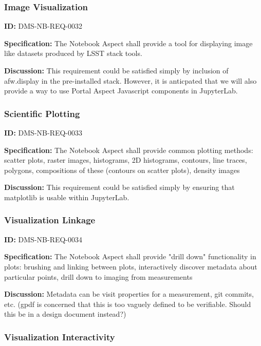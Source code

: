\documentclass[SE,toc]{lsstdoc}
\begin{document}
\subsubsection{Image Visualization}

\label{DMS-NB-REQ-0032}
\textbf{ID:} DMS-NB-REQ-0032

\textbf{Specification:}
The Notebook Aspect shall provide a tool for displaying image like datasets produced by LSST stack tools.

\textbf{Discussion:}
This requirement could be satisfied simply by inclusion of afw.display in the pre-installed stack.  However, it is anticpated that we will also provide a way to use Portal Aspect Javascript components in JupyterLab.

\subsubsection{Scientific Plotting}

\label{DMS-NB-REQ-0033}
\textbf{ID:} DMS-NB-REQ-0033

\textbf{Specification:}
The Notebook Aspect shall provide common plotting methods:
scatter plots, raster images, histograms, 2D histograms, contours, line traces, polygons, compositions of these (contours on scatter plots), density images

\textbf{Discussion:}
This requirement could be satisfied simply by ensuring that matplotlib is usable within JupyterLab.

\subsubsection{Visualization Linkage}

\label{DMS-NB-REQ-0034}
\textbf{ID:} DMS-NB-REQ-0034

\textbf{Specification:}
The Notebook Aspect shall provide "drill down" functionality in plots: brushing and linking between plots, interactively discover metadata about particular points, drill down to imaging from measurements

\textbf{Discussion:}
Metadata can be visit properties for a measurement, git commits, etc. (gpdf is concerned that this is too vaguely defined to be verifiable.  Should this be in a design document instead?)

\subsubsection{Visualization Interactivity}
\end{document}
